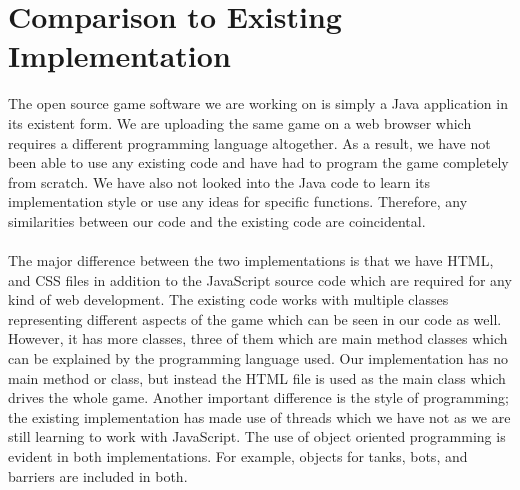\documentclass{article}
\begin{document}
\section{Comparison to Existing Implementation}
The open source game software we are working on is simply a Java application 
in its existent form. We are uploading the same game on a web browser which 
requires a different programming language altogether. As a result, we have not 
been able to use any existing code and have had to program the game completely 
from scratch. We have also not looked into the Java code to learn its 
implementation style or use any ideas for specific functions. Therefore, any 
similarities between our code and the existing code are coincidental. \\ \\
The major difference between the two implementations is that we have HTML, and 
CSS files in addition to the JavaScript source code which are required for any 
kind of web development. The existing code works with multiple classes 
representing different aspects of the game which can be seen in our code as 
well. However, it has more classes, three of them which are main method 
classes which can be explained by the programming language used. Our 
implementation has no main method or class, but instead the HTML file is used 
as the main class which drives the whole game. Another important difference is 
the style of programming; the existing implementation has made use of threads 
which we have not as we are still learning to work with JavaScript. The use of 
object oriented programming is evident in both implementations. For example, 
objects for tanks, bots, and barriers are included in both. 





\end{document}

